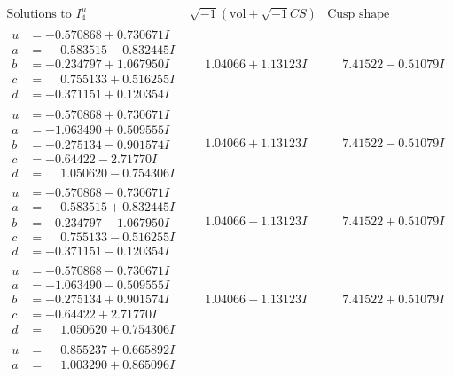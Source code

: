 \documentclass[1p]{elsarticle_modified}
\theoremstyle{definition}
\newcommand{\I}{\sqrt{-1}}
\begin{document}
$$\begin{array}{c|c|c}  
\text{Solutions to }I^u_{4}& \I (\text{vol} + \sqrt{-1}CS) & \text{Cusp shape}\\
 \hline 
\begin{aligned}
u &= -0.570868 + 0.730671 I \\
a &= \phantom{-}0.583515 - 0.832445 I \\
b &= -0.234797 + 1.067950 I \\
c &= \phantom{-}0.755133 + 0.516255 I \\
d &= -0.371151 + 0.120354 I\end{aligned}
 & \phantom{-}1.04066 + 1.13123 I & \phantom{-}7.41522 - 0.51079 I \\ \hline\begin{aligned}
u &= -0.570868 + 0.730671 I \\
a &= -1.063490 + 0.509555 I \\
b &= -0.275134 - 0.901574 I \\
c &= -0.64422 - 2.71770 I \\
d &= \phantom{-}1.050620 - 0.754306 I\end{aligned}
 & \phantom{-}1.04066 + 1.13123 I & \phantom{-}7.41522 - 0.51079 I \\ \hline\begin{aligned}
u &= -0.570868 - 0.730671 I \\
a &= \phantom{-}0.583515 + 0.832445 I \\
b &= -0.234797 - 1.067950 I \\
c &= \phantom{-}0.755133 - 0.516255 I \\
d &= -0.371151 - 0.120354 I\end{aligned}
 & \phantom{-}1.04066 - 1.13123 I & \phantom{-}7.41522 + 0.51079 I \\ \hline\begin{aligned}
u &= -0.570868 - 0.730671 I \\
a &= -1.063490 - 0.509555 I \\
b &= -0.275134 + 0.901574 I \\
c &= -0.64422 + 2.71770 I \\
d &= \phantom{-}1.050620 + 0.754306 I\end{aligned}
 & \phantom{-}1.04066 - 1.13123 I & \phantom{-}7.41522 + 0.51079 I \\ \hline\begin{aligned}
u &= \phantom{-}0.855237 + 0.665892 I \\
a &= \phantom{-}1.003290 + 0.865096 I \\

\end{aligned}
\end{array}$$
\end{document}
